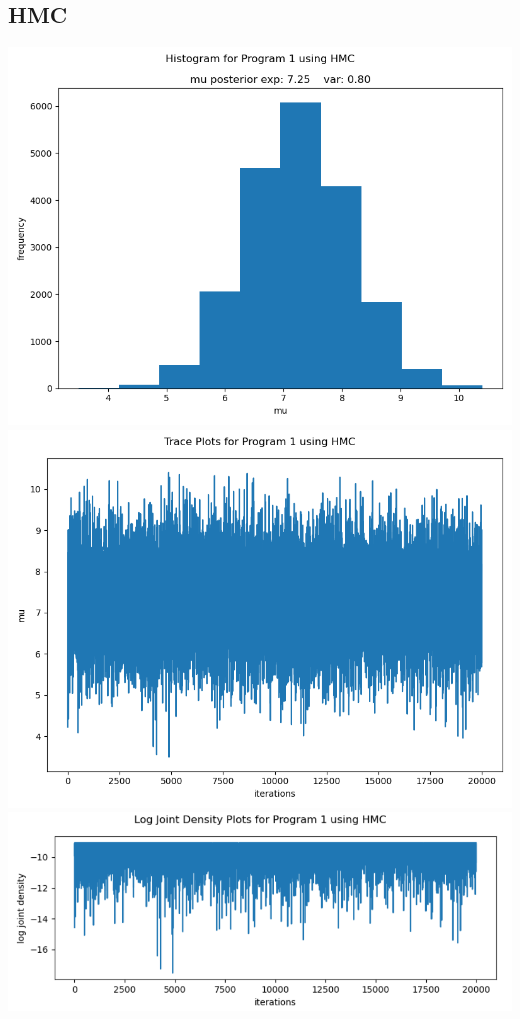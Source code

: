 \documentclass[10pt]{homeworg}
\begin{document}
\subsection{HMC}
\begin{center}
\includegraphics[scale=0.5]{figures/HMC_program_1.png}
\includegraphics[scale=0.5]{figures/trace_HMC_program_1.png}
\includegraphics[scale=0.58]{figures/log_joint_HMC_program_1.png}
\end{center}
\end{document}
